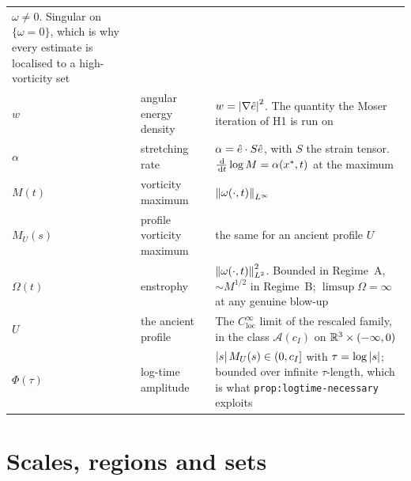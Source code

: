{\begin{longtable}{@{}l p{} p{}@{}}
  \(\omega\ne0\). Singular on \(\{\omega=0\}\), which is why every estimate is
  localised to a high-vorticity set \\
\(w\) & angular energy density & \(w=\left|\nabla\hat{e}\right|^2\). The quantity the
  Moser iteration of H1 is run on \\
\(\alpha\) & stretching rate & \(\alpha=\hat{e}\cdot S\hat{e}\), with \(S\) the
  strain tensor. \(\tfrac{\,\mathrm{d}}{\,\mathrm{d} t}\log M=\alpha(x^*,t)\) at the maximum \\
\(M(t)\) & vorticity maximum & \(\left\|\omega(\cdot,t)\right\|_{L^\infty}\) \\
\(M_U(s)\) & profile vorticity maximum & the same for an ancient profile \(U\) \\
\(\Omega(t)\) & enstrophy & \(\left\|\omega(\cdot,t)\right\|_{L^2}^2\). Bounded in
  Regime~A, \(\sim M^{1/2}\) in Regime~B; \(\limsup\Omega=\infty\) at any
  genuine blow-up \\
\(U\) & the ancient profile & The \(C^\infty_{\mathrm{loc}}\) limit of the
  rescaled family, in the class \(\mathcal{A}(c_I)\) on
  \(\mathbb{R}^3\times(-\infty,0)\) \\
\(\Phi(\tau)\) & log-time amplitude & \(\left|s\right|M_U(s)\in(0,c_I]\) with
  \(\tau=\log\left|s\right|\); bounded over infinite \(\tau\)-length, which is what
  \texttt{prop:logtime-necessary} exploits \\
\end{longtable}}

\section{Scales, regions and sets}
\label{sec:a3-regions}

